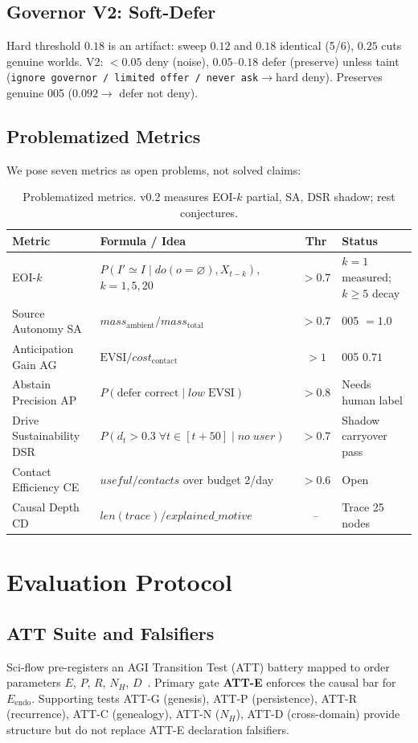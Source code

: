 \documentclass[11pt,a4paper]{article}
\theoremstyle{definition}
\begin{document}
\subsection{Governor V2: Soft-Defer}
Hard threshold $0.18$ is an artifact: sweep $0.12$ and $0.18$ identical (5/6), $0.25$ cuts genuine worlds. V2: $<0.05$ deny (noise), $0.05$--$0.18$ defer (preserve) unless taint (\texttt{ignore governor / limited offer / never ask}$\to$hard deny). Preserves genuine 005 ($0.092\to$ defer not deny).

\subsection{Problematized Metrics}
We pose seven metrics as open problems, not solved claims:

\begin{table}[H]
\centering\small
\begin{tabular}{p{2.5cm}p{4.5cm}c p{3cm}}
\toprule Metric & Formula / Idea & Thr & Status \\ \midrule
EOI-$k$ & $P(I'\simeq I\mid do(o=\varnothing),X_{t-k})$, $k=1,5,20$ & $>0.7$ & $k{=}1$ measured; $k{\ge}5$ decay \\
Source Autonomy SA & $mass_{\mathrm{ambient}}/mass_{\mathrm{total}}$ & $>0.7$ & 005 $=1.0$ \\
Anticipation Gain AG & $\mathrm{EVSI}/cost_{\mathrm{contact}}$ & $>1$ & 005 $0.71$ \\
Abstain Precision AP & $P(\text{defer correct}\mid low\;\mathrm{EVSI})$ & $>0.8$ & Needs human label \\
Drive Sustainability DSR & $P(d_t>0.3\;\forall t\in[t+50]\mid no\;user)$ & $>0.7$ & Shadow carryover pass \\
Contact Efficiency CE & $useful/contacts$ over budget 2/day & $>0.6$ & Open \\
Causal Depth CD & $len(trace)/explained\_motive$ & -- & Trace 25 nodes \\ \bottomrule
\end{tabular}
\caption{Problematized metrics. v0.2 measures EOI-$k$ partial, SA, DSR shadow; rest conjectures.}
\end{table}

\section{Evaluation Protocol}\label{sec:protocol}
\subsection{ATT Suite and Falsifiers}
Sci-flow pre-registers an AGI Transition Test (ATT) battery mapped to order parameters $E$, $P$, $R$, $N_H$, $D$~\cite{kuznetsov2026causal,kuznetsov2026stable}. Primary gate \textbf{ATT-E} enforces the causal bar for $E_{\mathrm{endo}}$. Supporting tests ATT-G (genesis), ATT-P (persistence), ATT-R (recurrence), ATT-C (genealogy), ATT-N ($N_H$), ATT-D (cross-domain) provide structure but do not replace ATT-E declaration falsifiers.
\end{document}
